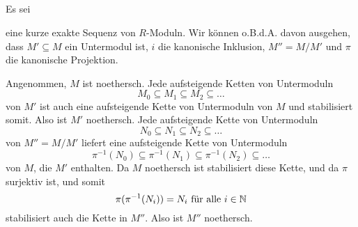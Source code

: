 \documentclass[a4paper,10pt]{article}
\begin{document}
\subsection{}
Es sei
\begin{center}
\end{center}
eine kurze exakte Sequenz von $R$-Moduln. Wir können o.B.d.A. davon ausgehen, dass $M' \subseteq M$ ein Untermodul ist, $i$ die kanonische Inklusion, $M'' = M/M'$ und $\pi$ die kanonische Projektion.

Angenommen, $M$ ist noethersch. Jede aufsteigende Ketten von Untermoduln
\[
 M_0 \subseteq M_1 \subseteq M_2 \subseteq \ldots
\]
von $M'$ ist auch eine aufsteigende Kette von Untermoduln von $M$ und stabilisiert somit. Also ist $M'$ noethersch. Jede aufsteigende Kette von Untermoduln
\[
 N_0 \subseteq N_1 \subseteq N_2 \subseteq \ldots
\]
von $M'' = M/M'$ liefert eine aufsteigende Kette von Untermoduln
\[
 \pi^{-1}(N_0) \subseteq \pi^{-1}(N_1) \subseteq \pi^{-1}(N_2) \subseteq \ldots
\]
von $M$, die $M'$ enthalten. Da $M$ noethersch ist stabilisiert diese Kette, und da $\pi$ surjektiv ist, und somit
\[
 \pi(\pi^{-1}(N_i)) = N_i \text{ für alle } i \in \mathbb{N}
\]
stabilisiert auch die Kette in $M''$. Also ist $M''$ noethersch.
\end{document}
